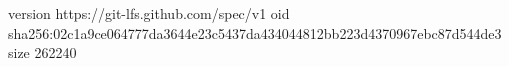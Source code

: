 version https://git-lfs.github.com/spec/v1
oid sha256:02c1a9ce064777da3644e23c5437da434044812bb223d4370967ebc87d544de3
size 262240
